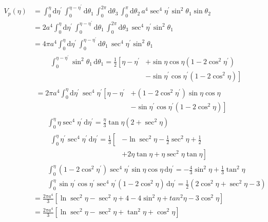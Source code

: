 \documentclass[preprint,notitlepage,amsmath,amssymb,floatfix]{revtex4-1}
\begin{document}
\begin{align}
V_p\left(\eta\right) &= \int_0^\eta \! \mathrm d\eta^\prime \, \int_0^{\eta-\eta^\prime} \! \mathrm d\theta_1 \, \int_0^{2\pi}\!\mathrm d\theta_3\, \int_0^\pi\!\mathrm d\theta_2\, a^4\sec^4\eta^\prime\sin^2\theta_1\sin\theta_2 \\
  &= 2a^4\int_0^\eta\!\mathrm d\eta^\prime\, \int_0^{\eta-\eta^\prime}\!\mathrm d\theta_1\, \int_0^{2\pi}\!\mathrm d\theta_3\, \sec^4\eta^\prime\sin^2\theta_1 \\
  &= 4\pi a^4 \int_0^\eta\!\mathrm d\eta^\prime\,\int_0^{\eta-\eta^\prime}\!\mathrm d\theta_1\, \sec^4\eta^\prime\sin^2\theta_1 \\
  &\qquad\begin{aligned}
    \int_0^{\eta-\eta^\prime}\!\sin^2\theta_1\,\mathrm d\theta_1 = \frac{1}{2}\left[\eta-\eta^\prime\right.&\left.+\sin\eta\cos\eta\left(1-2\cos^2\eta^\prime\right)\right. \\
    &\left.-\sin\eta^\prime\cos\eta^\prime\left(1-2\cos^2\eta\right)\right]
  \end{aligned} \\
  &\begin{aligned}
    = 2\pi a^4\int_0^\eta\!\mathrm d\eta^\prime\,\sec^4\eta^\prime\left[\eta-\eta^\prime\right.&\left.+\left(1-2\cos^2\eta^\prime\right)\sin\eta\cos\eta\right. \\
    &\left.-\sin\eta^\prime\cos\eta^\prime\left(1-2\cos^2\eta\right)\right]
  \end{aligned} \\
  &\qquad\int_0^\eta\!\eta\sec^4\eta^\prime\,\mathrm d\eta^\prime = \frac{\eta}{3}\tan\eta\left(2+\sec^2\eta\right) \\
  &\qquad\begin{aligned}
    \int_0^\eta\!\eta^\prime\sec^4\eta^\prime\,\mathrm d\eta^\prime = \frac{1}{3}\left[\right.&\left.-\ln\sec^2\eta-\frac{1}{2}\sec^2\eta + \frac{1}{2}\right. \\
    &\left.+2\eta\tan\eta+\eta\sec^2\eta\tan\eta\right]
  \end{aligned} \\
  &\qquad\int_0^\eta\!\left(1-2\cos^2\eta^\prime\right)\sec^4\eta^\prime\sin\eta\cos\eta\,\mathrm d\eta^\prime = -\frac{4}{3}\sin^2\eta+\frac{1}{3}\tan^2\eta \\
  &\qquad\int_0^\eta\!\sin\eta^\prime\cos\eta^\prime\sec^4\eta^\prime\left(1-2\cos^2\eta\right)\,\mathrm d\eta^\prime = \frac{1}{2}\left(2\cos^2\eta+\sec^2\eta-3\right) \\
  &= \frac{2\pi a^4}{3}\left[\ln\sec^2\eta-\sec^2\eta+4-4\sin^2\eta+tan^2\eta-3\cos^2\eta\right] \\
  &= \frac{2\pi a^4}{3}\left[\ln\sec^2\eta-\sec^2\eta+\tan^2\eta+\cos^2\eta\right]
\end{align}
\end{document}
